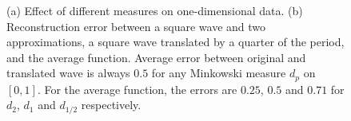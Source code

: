 \documentclass{article}
\begin{document}
\begin{figure}%
\centering
{} 
\hspace{0.1cm}
%
\hspace{8pt}%
\caption{(a) Effect of different measures on one-dimensional data. (b)
  Reconstruction error between a square wave and two approximations, a
  square wave translated by a quarter of the period, and the average
  function. Average error between original and translated wave is
  always $0.5$ for any Minkowski measure $d_p$ on $[0,1]$.  For the
  average function, the errors are $0.25$, $0.5$ and $0.71$ for $d_2$,
  $d_1$ and $d_{1/2}$ respectively.}%
\label{fig:two_measures}
\end{figure}
\end{document}

